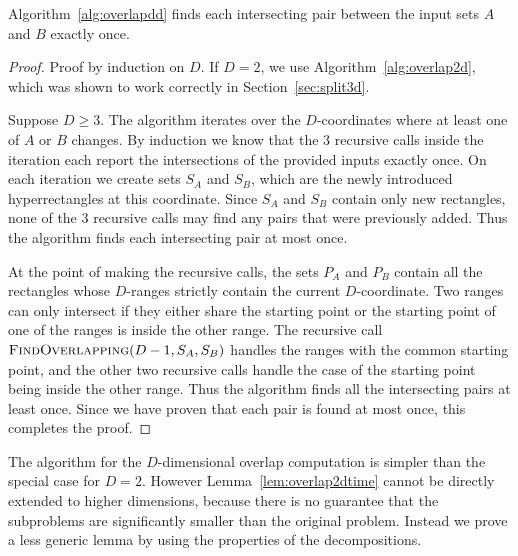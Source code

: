 \documentclass[english,gradu]{tktltiki2018}
\begin{document}
\begin{lem}\label{lem:overlapddok}
Algorithm~\ref{alg:overlapdd} finds each intersecting pair between the input sets $A$ and $B$ exactly once.
\end{lem}
\begin{proof}
Proof by induction on $D$.
If $D=2$, we use Algorithm~\ref{alg:overlap2d}, which was shown to work correctly in Section~\ref{sec:split3d}.

Suppose $D\ge 3$.
The algorithm iterates over the $D$-coordinates where at least one of $A$ or $B$ changes.
By induction we know that the 3 recursive calls inside the iteration each report the intersections of the provided inputs exactly once.
On each iteration we create sets $S_A$ and $S_B$, which are the newly introduced hyperrectangles at this coordinate.
Since $S_A$ and $S_B$ contain only new rectangles, none of the 3 recursive calls may find any pairs that were previously added.
Thus the algorithm finds each intersecting pair at most once.

At the point of making the recursive calls, the sets $P_A$ and $P_B$ contain all the rectangles whose $D$-ranges strictly contain the current $D$-coordinate.
Two ranges can only intersect if they either share the starting point or the starting point of one of the ranges is inside the other range.
The recursive call $\textsc{FindOverlapping}(D-1,S_A,S_B)$ handles the ranges with the common starting point, and the other two recursive calls handle the case of the starting point being inside the other range.
Thus the algorithm finds all the intersecting pairs at least once.
Since we have proven that each pair is found at most once, this completes the proof.
\end{proof}

The algorithm for the $D$-dimensional overlap computation is simpler than the special case for $D=2$.
However Lemma~\ref{lem:overlap2dtime} cannot be directly extended to higher dimensions, because there is no guarantee that the subproblems are significantly smaller than the original problem.
Instead we prove a less generic lemma by using the properties of the decompositions.
\end{document}
